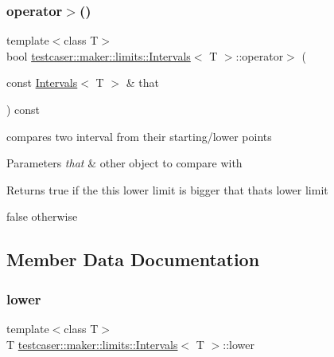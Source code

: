 \subsubsection{\texorpdfstring{operator$>$()}{operator>()}}
{\footnotesize\ttfamily template$<$class T$>$ \\
bool \mbox{\hyperlink{structtestcaser_1_1maker_1_1limits_1_1Intervals}{testcaser\+::maker\+::limits\+::\+Intervals}}$<$ T $>$\+::operator$>$ (\begin{DoxyParamCaption}\item[{const \mbox{\hyperlink{structtestcaser_1_1maker_1_1limits_1_1Intervals}{Intervals}}$<$ T $>$ \&}]{that }\end{DoxyParamCaption}) const\hspace{0.3cm}{\ttfamily [inline]}}



compares two interval from their starting/lower points 


\begin{DoxyParams}{Parameters}
{\em that} & other object to compare with \\
\hline
\end{DoxyParams}
\begin{DoxyReturn}{Returns}
true if the this lower limit is bigger that that\textquotesingle{}s lower limit 

false otherwise 
\end{DoxyReturn}


\subsection{Member Data Documentation}
\mbox{\label{structtestcaser_1_1maker_1_1limits_1_1Intervals_a51f277024599c24b6bfdffe1276f236d}} 
\subsubsection{\texorpdfstring{lower}{lower}}
{\footnotesize\ttfamily template$<$class T$>$ \\
T \mbox{\hyperlink{structtestcaser_1_1maker_1_1limits_1_1Intervals}{testcaser\+::maker\+::limits\+::\+Intervals}}$<$ T $>$\+::lower}



